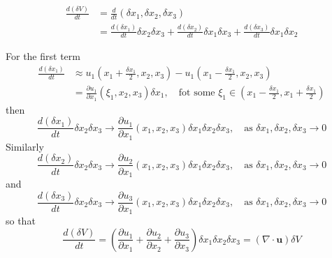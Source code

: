 

\begin{equation}
\begin{aligned}
\frac{d(\delta V)}{dt}
&= \frac{d}{dt}(\delta x_1, \delta x_2, \delta x_3)\\
&= \frac{d(\delta x_1)}{dt} \delta x_2 \delta x_3
+ \frac{d(\delta x_2)}{dt} \delta x_1 \delta x_3
+ \frac{d(\delta x_3)}{dt} \delta x_1 \delta x_2
\end{aligned}
\end{equation}

For the first term
\begin{equation}
\begin{aligned}
\frac{d(\delta x_1)}{dt}
&\approx u_1\left(x_1+\frac{\delta x_1}{2}, x_2, x_3\right)
- u_1\left(x_1-\frac{\delta x_1}{2}, x_2, x_3\right)\\
&= \frac{\partial u_1}{\partial x_1}(\xi_1, x_2,x_3) \delta x_1,\quad \text{fot some $\xi_1\in\left(x_1-\frac{\delta x_1}{2},x_1+\frac{\delta x_1}{2}\right)$}
\end{aligned}
\end{equation}
then 
\begin{equation}
\frac{d(\delta x_1)}{dt}\delta x_2 \delta x_3 \to
\frac{\partial u_1}{\partial x_1}(x_1, x_2,x_3) \delta x_1\delta x_2 \delta x_3,
\quad \text{as $\delta x_1,\delta x_2, \delta x_3 \to 0$}
\end{equation}
Similarly 
\begin{equation}
\frac{d(\delta x_2)}{dt}\delta x_2 \delta x_3 \to
\frac{\partial u_2}{\partial x_1}(x_1, x_2,x_3) \delta x_1\delta x_2 \delta x_3,
\quad \text{as $\delta x_1,\delta x_2, \delta x_3 \to 0$}
\end{equation}
and 
\begin{equation}
\frac{d(\delta x_3)}{dt}\delta x_2 \delta x_3 \to
\frac{\partial u_3}{\partial x_1}(x_1, x_2,x_3) \delta x_1\delta x_2 \delta x_3,
\quad \text{as $\delta x_1,\delta x_2, \delta x_3 \to 0$}
\end{equation}
so that 
\begin{equation}
\frac{d(\delta V)}{dt} = \left(
\frac{\partial u_1}{\partial x_1}
+ \frac{\partial u_2}{\partial x_2}
+ \frac{\partial u_3}{\partial x_3}
\right) \delta x_1\delta x_2 \delta x_3
= (\nabla \cdot \textbf{u}) \delta V
\end{equation}

